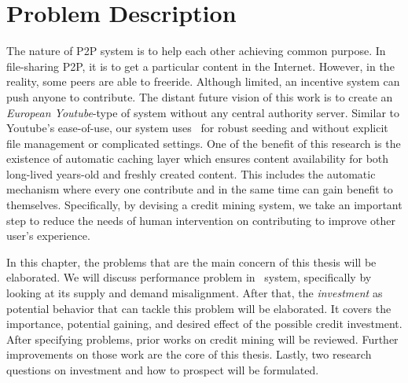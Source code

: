\chapter{Problem Description}
\label{chp:relwork}
The nature of P2P system is to help each other achieving common purpose. In file-sharing P2P, it is to get a particular content in the Internet. However, in the reality, some peers are able to freeride. Although limited, an incentive system can push anyone to contribute. The distant future vision of this work is to create an \textit{European Youtube}-type of system without any central authority server. Similar to Youtube's ease-of-use, our system uses \bt~for robust seeding and without explicit file management or complicated settings. One of the benefit of this research is the existence of automatic caching layer which ensures content availability for both long-lived years-old and freshly created content. This includes the automatic mechanism where every one contribute and in the same time can gain benefit to themselves. Specifically, by devising a credit mining system, we take an important step to reduce the needs of human intervention on contributing to improve other user's experience.

In this chapter, the problems that are the main concern of this thesis will be elaborated. We will discuss performance problem in \bt~system, specifically by looking at its supply and demand misalignment. After that, the \textit{investment} as potential behavior that can tackle this problem will be elaborated. It covers the importance, potential gaining, and desired effect of the possible credit investment. After specifying problems, prior works on credit mining will be reviewed. Further improvements on those work are the core of this thesis. Lastly, two research questions on investment and how to prospect will be formulated.
 

